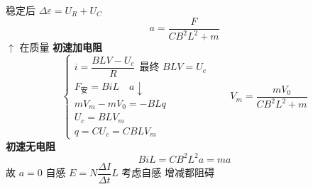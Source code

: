 稳定后 $\Delta\varepsilon=U_R+U_C$
\[ a=\frac{F}{CB^2L^2+m} \]
$\uparrow$ 在质量
\textbf{初速加电阻} %
\[ \left\{\begin{array}{l}
i=\dfrac{BLV-U_c}{R}\ \ \text{最终 }BLV=U_c\\[2.5ex]
F_{\text{安}}=BiL\quad a\downarrow\\[1ex]
mV_m-mV_0=-BLq\\[1ex]
U_c=BLV_m\\[1ex]
q=CU_c=CBLV_m
\end{array}\right.\qquad V_m=\frac{mV_0}{CB^2L^2+m} \]
\textbf{初速无电阻} %
\[ BiL=CB^2L^2a=ma \]
故 $a=0$
自感 $E=N\dfrac{\Delta I}{\Delta t}L$ %
考虑自感
增减都阻碍
